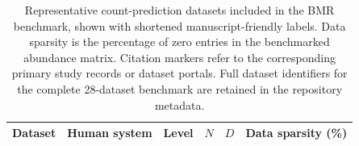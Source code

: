 \documentclass{jmlr}
\begin{document}
\begin{table}[htbp]
\caption{Representative count-prediction datasets included in the BMR benchmark, shown with shortened manuscript-friendly labels.
Data sparsity is the percentage of zero entries in the benchmarked abundance matrix.
Citation markers refer to the corresponding primary study records or dataset portals.
Full dataset identifiers for the complete 28-dataset benchmark are retained in the repository metadata.}
\label{tab:bmr-count-datasets}
\centering
\scriptsize
\setlength{\tabcolsep}{4pt}
\renewcommand{\arraystretch}{0.94}
\begin{tabular}{>{\raggedright\arraybackslash}p{}>{\raggedright\arraybackslash}p{}>{\raggedright\arraybackslash}p{}rrr}
\toprule
Dataset & Human system & Level & $N$ & $D$ & Data sparsity (\%) \\
\midrule


\end{tabular}
\end{table}
\end{document}
